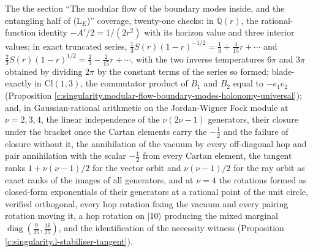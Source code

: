 \documentclass[11pt]{article}
\theoremstyle{definition}
\theoremstyle{plain}
\providecommand{\Cl}{}\renewcommand{\Cl}{\mathrm{Cl}}
\begin{document}
The the section ``The modular flow of the boundary modes inside, and the entangling half of (L$_E$)'' coverage, twenty-one checks: in $\mathbb{Q}(r)$, the rational-function identity $-A'/2 = 1/(2r^2)$ with its horizon value and three interior values; in exact truncated series, $\tfrac13 S(r)(1 - r)^{-1/2} = \tfrac13 + \tfrac{4}{15}r + \cdots$ and $\tfrac23 S(r)(1 - r)^{1/2} = \tfrac23 - \tfrac{2}{15}r + \cdots$, with the two inverse temperatures $6\pi$ and $3\pi$ obtained by dividing $2\pi$ by the constant terms of the series so formed; blade-exactly in $\Cl(1,3)$, the commutator product of $B_1$ and $B_2$ equal to $-e_1 e_2$ (Proposition \ref{c:singularity.modular-flow-boundary-modes-holonomy-universal}); and, in Gaussian-rational arithmetic on the Jordan-Wigner Fock module at $\nu = 2, 3, 4$, the linear independence of the $\nu(2\nu - 1)$ generators, their closure under the bracket once the Cartan elements carry the $-\tfrac12$ and the failure of closure without it, the annihilation of the vacuum by every off-diagonal hop and pair annihilation with the scalar $-\tfrac12$ from every Cartan element, the tangent ranks $1 + \nu(\nu - 1)/2$ for the vector orbit and $\nu(\nu - 1)/2$ for the ray orbit as exact ranks of the images of all generators, and at $\nu = 4$ the rotations formed as closed-form exponentials of their generators at a rational point of the unit circle, verified orthogonal, every hop rotation fixing the vacuum and every pairing rotation moving it, a hop rotation on $|10\rangle$ producing the mixed marginal $\operatorname{diag}(\tfrac{9}{25}, \tfrac{16}{25})$, and the identification of the necessity witness (Proposition \ref{c:singularity.l-stabiliser-tangent}).
\end{document}
